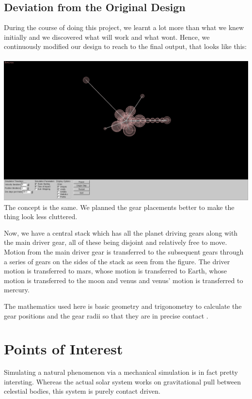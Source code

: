 \documentclass[12pt]{article}
\begin{document}
\subsection{Deviation from the Original Design}
During the course of doing this project, we learnt a lot more than what we knew initially and we discovered what will work and what wont. Hence, we continuously modified our design to reach to the final output, that looks like this:
\\ \\
\includegraphics[scale=0.25]{./img/gui.png}
\\

The concept is the same. We planned the gear placements better to make the thing look less cluttered. 

Now, we have a central stack which has all the planet driving gears along with the main driver gear, all of these being disjoint and relatively free to move. Motion from the main driver gear is transferred to the subsequent gears through a series of gears on the sides of the stack as seen from the figure. The driver motion is transferred to mars, whose motion is transferred to Earth, whose motion is transferred to the moon and venus and venus' motion is transferred to mercury.

The mathematics used here is basic geometry and trigonometry to calculate the gear positions and the gear radii so that they are in precise contact \cite{halliday}.

\section{Points of Interest}
Simulating a natural phenomenon via a mechanical simulation is in fact pretty intersting. Whereas the actual solar system works on gravitational pull between celestial bodies, this system is purely contact driven. 
\end{document}
